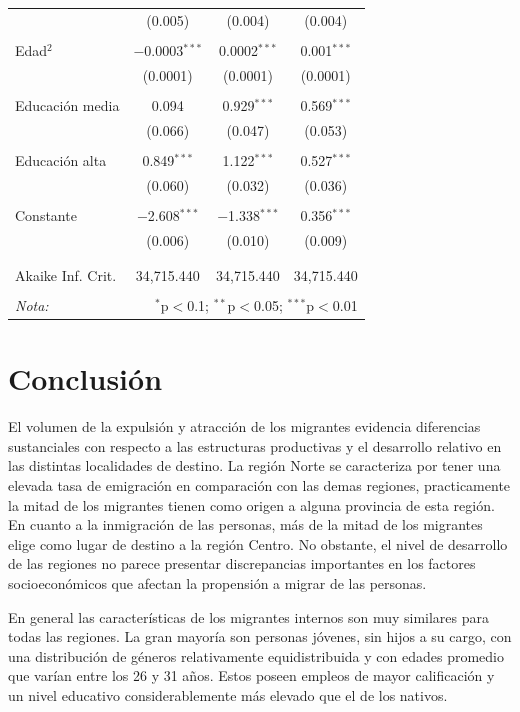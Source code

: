 \documentclass[12pt,a4paper]{article}
\begin{document}
\begin{table}[!htbp]
\begin{tabular}{@{\extracolsep{5pt}}lccc}
  & (0.005) & (0.004) & (0.004) \\ 
  & & & \\ 
 Edad$^2$ & $-$0.0003$^{***}$ & 0.0002$^{***}$ & 0.001$^{***}$ \\ 
  & (0.0001) & (0.0001) & (0.0001) \\ 
  & & & \\ 
 Educación media & 0.094 & 0.929$^{***}$ & 0.569$^{***}$ \\ 
  & (0.066) & (0.047) & (0.053) \\ 
  & & & \\ 
  Educación alta & 0.849$^{***}$ & 1.122$^{***}$ & 0.527$^{***}$ \\ 
  & (0.060) & (0.032) & (0.036) \\ 
  & & & \\ 
 Constante & $-$2.608$^{***}$ & $-$1.338$^{***}$ & 0.356$^{***}$ \\ 
  & (0.006) & (0.010) & (0.009) \\ 
  & & & \\ 
\hline \\[-1.8ex] 
Akaike Inf. Crit. & 34,715.440 & 34,715.440 & 34,715.440 \\ 
\hline 
\hline \\[-1.8ex] 
\textit{Nota:}  & \multicolumn{3}{r}{$^{*}$p$<$0.1; $^{**}$p$<$0.05; $^{***}$p$<$0.01} \\ 
\end{tabular} 
\end{table} 

\newpage

\section{Conclusión}
El volumen de la expulsión y atracción de los migrantes evidencia diferencias sustanciales con respecto a las estructuras productivas y el desarrollo relativo en las distintas localidades de destino. La región Norte se caracteriza por tener una elevada tasa de emigración  en comparación con las demas regiones, practicamente la mitad de los migrantes tienen como origen a alguna provincia de esta región. En cuanto a la inmigración de las personas, más de la mitad de los migrantes elige como lugar de destino a la región Centro. No obstante, el nivel de desarrollo de las regiones no parece presentar discrepancias importantes en los factores socioeconómicos que afectan la propensión a migrar de las personas.

En general las características de los migrantes internos son muy similares para todas las regiones. La gran mayoría son personas jóvenes, sin hijos a su cargo, con una distribución de géneros relativamente equidistribuida y con edades promedio que varían entre los 26 y 31 años. Estos poseen empleos de mayor calificación y un nivel educativo considerablemente más elevado que el de los nativos. 
\end{document}

